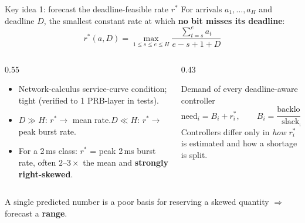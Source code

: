 \documentclass[aspectratio=169,11pt,xcolor=table]{beamer}
\newcommand{\rstar}{r^{\ast}}
\begin{document}
\begin{frame}{Key idea 1: forecast the deadline-feasible rate $\rstar$}
  For arrivals $a_1,\dots,a_H$ and deadline $D$, the smallest constant rate at which \textbf{no bit misses its deadline}:
  \[
    \boxed{\;\rstar(a, D) = \max_{1\le s\le e\le H} \frac{\sum_{t=s}^{e} a_t}{e - s + 1 + D}\;}
  \]
  \begin{columns}[T]
    \begin{column}{0.55\textwidth}
      \begin{itemize}
        \item Network-calculus service-curve condition; tight (verified to 1 PRB-layer in tests).
        \item $D \gg H$: $\rstar \to$ mean rate.\quad $D \ll H$: $\rstar \to$ peak burst rate.
        \item For a 2\,ms class: $\rstar$ = peak 2\,ms burst rate, often $2$--$3\times$ the mean and \textbf{strongly right-skewed}.
      \end{itemize}
    \end{column}
    \begin{column}{0.43\textwidth}
      \begin{block}{Demand of every deadline-aware controller}
        \[
          \text{need}_i = B_i + \rstar_i,\qquad B_i = \frac{\text{backlog}_i}{\text{slack}_i}
        \]
        Controllers differ only in \emph{how} $\rstar_i$ is estimated and how a shortage is split.
      \end{block}
    \end{column}
  \end{columns}
  \vspace{0.3em}
  \centering\small A single predicted number is a poor basis for reserving a skewed quantity $\Rightarrow$ forecast a \textbf{range}.
\end{frame}
\end{document}

